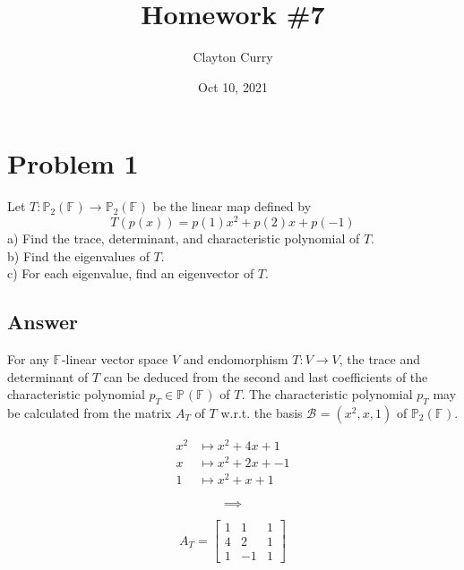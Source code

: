 \documentclass[
	12pt, %
]{fphw}
\title{Homework \#7} %
\author{Clayton Curry} %
\date{Oct 10, 2021} %
\institute{University of Oklahoma \\ Department of Mathematics} %
\newcommand\0{\mathbf{0}}
\newcommand\F[1]{\text{$\mathbb{F}^{#1}$}}
\newcommand\B[1]{\text{$\mathcal{B}_{#1}$}}
\newcommand\poly[1]{\text{$\mathbb{P}_{#1}(\F{})$}}
\begin{document}
\maketitle %


\section*{Problem 1}
\begin{problem}
Let $T: \poly{2} \to \poly{2}$ be the linear map defined by
\begin{equation*}
T(p(x))=p(1)x^2+p(2)x+p(-1)
\end{equation*}
\noindent
a) Find the trace, determinant, and characteristic polynomial of $T$.\\
b) Find the eigenvalues of $T$.\\
c) For each eigenvalue, find an eigenvector of $T$.
\end{problem}

\subsection*{Answer} For any $\F{}$-linear vector space $V$  and endomorphism $T : V \to V$, the trace and determinant of $T$ can be deduced from the second and last coefficients of the characteristic polynomial $p_T \in \poly{}$ of $T$. The characteristic polynomial $p_T$ may be calculated from the matrix $A_T$ of $T$ w.r.t. the basis $\B{}=(x^2, x, 1)$ of $\poly{2}$.
\begin{center}
\begin{minipage}{0.30\textwidth}
\begin{align*}
x^2 &\mapsto x^2 + 4 x + 1\\
x &\mapsto x^2 + 2 x + -1 \\
1 &\mapsto x^2 + x + 1
\end{align*}
\end{minipage}%
\begin{minipage}{0.05\textwidth}
$$
\implies
$$
\end{minipage}
\begin{minipage}{0.30\textwidth}
$$
A_T=\begin{bmatrix}
1 & 1 & 1\\
4 & 2 & 1\\
1 & -1 & 1
\end{bmatrix}
$$
\end{minipage}%
\end{center}
\end{document}
